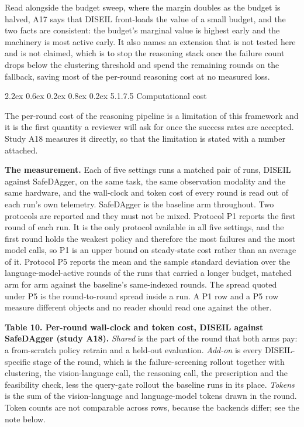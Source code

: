 \documentclass[
  11pt,
]{article}
\makeatletter
\renewcommand\paragraph{\@startsection{paragraph}{4}{\z@}%
  {2.2ex \@plus 0.6ex \@minus 0.2ex}%
  {0.8ex \@plus 0.2ex}%
  {\normalfont\normalsize\bfseries}}
\makeatother
\begin{document}
Read alongside the budget sweep, where the margin doubles as the budget
is halved, A17 says that DISEIL front-loads the value of a small budget,
and the two facts are consistent: the budget's marginal value is highest
early and the machinery is most active early. It also names an extension
that is not tested here and is not claimed, which is to stop the
reasoning stack once the failure count drops below the clustering
threshold and spend the remaining rounds on the fallback, saving most of
the per-round reasoning cost at no measured loss.

\hypertarget{computational-cost}{%
\paragraph{5.1.7.5 Computational cost}\label{computational-cost}}

The per-round cost of the reasoning pipeline is a limitation of this
framework and it is the first quantity a reviewer will ask for once the
success rates are accepted. Study A18 measures it directly, so that the
limitation is stated with a number attached.

\textbf{The measurement.} Each of five settings runs a matched pair of
runs, DISEIL against SafeDAgger, on the same task, the same observation
modality and the same hardware, and the wall-clock and token cost of
every round is read out of each run's own telemetry. SafeDAgger is the
baseline arm throughout. Two protocols are reported and they must not be
mixed. Protocol P1 reports the first round of each run. It is the only
protocol available in all five settings, and the first round holds the
weakest policy and therefore the most failures and the most model calls,
so P1 is an upper bound on steady-state cost rather than an average of
it. Protocol P5 reports the mean and the sample standard deviation over
the language-model-active rounds of the runs that carried a longer
budget, matched arm for arm against the baseline's same-indexed rounds.
The spread quoted under P5 is the round-to-round spread inside a run. A
P1 row and a P5 row measure different objects and no reader should read
one against the other.

\textbf{Table 10. Per-round wall-clock and token cost, DISEIL against
SafeDAgger (study A18).} \emph{Shared} is the part of the round that
both arms pay: a from-scratch policy retrain and a held-out evaluation.
\emph{Add-on} is every DISEIL-specific stage of the round, which is the
failure-screening rollout together with clustering, the vision-language
call, the reasoning call, the prescription and the feasibility check,
less the query-gate rollout the baseline runs in its place.
\emph{Tokens} is the sum of the vision-language and language-model
tokens drawn in the round. Token counts are not comparable across rows,
because the backends differ; see the note below.
\end{document}
